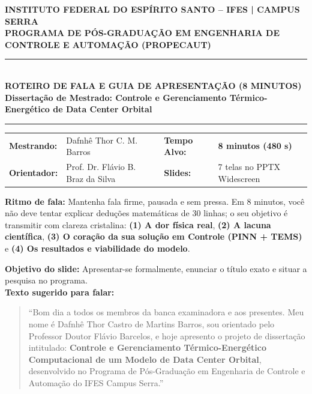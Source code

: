 \documentclass[11pt,a4paper]{article}
\begin{document}
\begin{center}
    {\small\textbf{INSTITUTO FEDERAL DO ESPÍRITO SANTO -- IFES | CAMPUS SERRA}}\\[2pt]
    {\small\textbf{PROGRAMA DE PÓS-GRADUAÇÃO EM ENGENHARIA DE CONTROLE E AUTOMAÇÃO (PROPECAUT)}}\\[4pt]
    \rule{\textwidth}{1.2pt}\\[5pt]
    {\large\textbf{\color{ifesgreen}ROTEIRO DE FALA E GUIA DE APRESENTAÇÃO (8 MINUTOS)}}\\[2pt]
    {\small\textbf{Dissertação de Mestrado: Controle e Gerenciamento Térmico-Energético de Data Center Orbital}}\\[4pt]
    \rule{\textwidth}{0.6pt}
\end{center}

\vspace{-6pt}
\begin{center}
    \small
    \begin{tabularx}{\textwidth}{lXlX}
        \textbf{Mestrando:} & Dafnhê Thor C. M. Barros & \textbf{Tempo Alvo:} & \textbf{8 minutos (480 s)} \\
        \textbf{Orientador:} & Prof. Dr. Flávio B. Braz da Silva & \textbf{Slides:} & 7 telas no PPTX Widescreen
    \end{tabularx}
\end{center}

\vspace{2pt}

\begin{tcolorbox}[colback=lightgray, colframe=ifesgreen, title=\color{ifesgreen}\textbf{DIRETRIZ DE POSTURA E TEMPO PARA APRESENTAÇÃO DE 8 MINUTOS}]
\small
\textbf{Ritmo de fala:} Mantenha fala firme, pausada e sem pressa. Em 8 minutos, você não deve tentar explicar deduções matemáticas de 30 linhas; o seu objetivo é transmitir com clareza cristalina: \textbf{(1) A dor física real}, \textbf{(2) A lacuna científica}, \textbf{(3) O coração da sua solução em Controle (PINN + TEMS)} e \textbf{(4) Os resultados e viabilidade do modelo}.
\end{tcolorbox}

\vspace{6pt}

\begin{tcolorbox}[colback=speechbg, colframe=bordergreen, title=\color{ifesdark}\textbf{SLIDE 1: CAPA OFICIAL \hfill TEMPO: 0:00 -- 0:30 (Duração: 30 segundos)}]
\small
\textbf{Objetivo do slide:} Apresentar-se formalmente, enunciar o título exato e situar a pesquisa no programa.\\
\textbf{Texto sugerido para falar:}
\begin{quote}
``Bom dia a todos os membros da banca examinadora e aos presentes. Meu nome é Dafnhê Thor Castro de Martins Barros, sou orientado pelo Professor Doutor Flávio Barcelos, e hoje apresento o projeto de dissertação intitulado: \textbf{Controle e Gerenciamento Térmico-Energético Computacional de um Modelo de Data Center Orbital}, desenvolvido no Programa de Pós-Graduação em Engenharia de Controle e Automação do IFES Campus Serra.''
\end{quote}
\end{tcolorbox}
\end{document}
